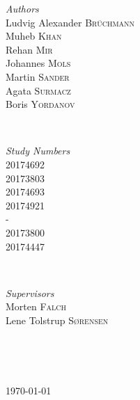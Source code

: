 \documentclass[12p]{article}
\begin{document}
\begin{titlepage}
	\begin{minipage}{0.4\textwidth}
    \begin{flushleft} \large
    \emph{Authors}\\
        Ludvig Alexander \textsc{Brüchmann} \\
        Muheb \textsc{Khan} \\
    	Rehan \textsc{Mir} \\
    	Johannes \textsc{Mols} \\
    	Martin \textsc{Sander} \\
    	Agata \textsc{Surmacz} \\
    	Boris \textsc{Yordanov} \\
    \end{flushleft}
    \end{minipage}
    ~
    \begin{minipage}{0.4\textwidth}
    \begin{flushright} \large
    \emph{Study Numbers} \\
        20174692 \\
        20173803 \\
        20174693 \\
        20174921 \\
        - \\
        20173800 \\
        20174447 \\
    \end{flushright}
    \end{minipage}\\[0.5cm]
    
    
    \begin{minipage}{0.4\textwidth}
    \begin{flushleft} \large
    \emph{Supervisors}\\
        Morten \textsc{Falch} \\
        Lene Tolstrup \textsc{Sørensen} \\
    \end{flushleft}
    \end{minipage}
    ~
    \begin{minipage}{0.4\textwidth}
    \begin{flushright} \large
    \end{flushright}
    \end{minipage}\\[0.5cm]

	
	\vfill\vfill\vfill %
	
	{\large\today} %
	
    
\end{titlepage}
\end{document}
